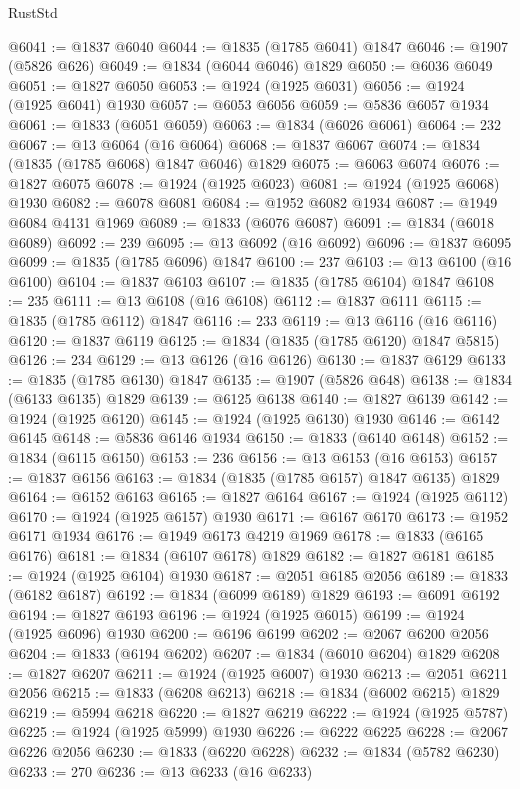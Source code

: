 \begin{lexlean}{RustStd}
\begin{coremodule}
{\begin{coremodule}
{{{{{@6041 := @1837 @6040
@6044 := @1835 (@1785 @6041) @1847
@6046 := @1907 (@5826 @626)
@6049 := @1834 (@6044 @6046) @1829
@6050 := @6036 @6049
@6051 := @1827 @6050
@6053 := @1924 (@1925 @6031)
@6056 := @1924 (@1925 @6041) @1930
@6057 := @6053 @6056
@6059 := @5836 @6057 @1934
@6061 := @1833 (@6051 @6059)
@6063 := @1834 (@6026 @6061)
@6064 := 232
@6067 := @13 @6064 (@16 @6064)
@6068 := @1837 @6067
@6074 := @1834 (@1835 (@1785 @6068) @1847 @6046) @1829
@6075 := @6063 @6074
@6076 := @1827 @6075
@6078 := @1924 (@1925 @6023)
@6081 := @1924 (@1925 @6068) @1930
@6082 := @6078 @6081
@6084 := @1952 @6082 @1934
@6087 := @1949 @6084 @4131 @1969
@6089 := @1833 (@6076 @6087)
@6091 := @1834 (@6018 @6089)
@6092 := 239
@6095 := @13 @6092 (@16 @6092)
@6096 := @1837 @6095
@6099 := @1835 (@1785 @6096) @1847
@6100 := 237
@6103 := @13 @6100 (@16 @6100)
@6104 := @1837 @6103
@6107 := @1835 (@1785 @6104) @1847
@6108 := 235
@6111 := @13 @6108 (@16 @6108)
@6112 := @1837 @6111
@6115 := @1835 (@1785 @6112) @1847
@6116 := 233
@6119 := @13 @6116 (@16 @6116)
@6120 := @1837 @6119
@6125 := @1834 (@1835 (@1785 @6120) @1847 @5815)
@6126 := 234
@6129 := @13 @6126 (@16 @6126)
@6130 := @1837 @6129
@6133 := @1835 (@1785 @6130) @1847
@6135 := @1907 (@5826 @648)
@6138 := @1834 (@6133 @6135) @1829
@6139 := @6125 @6138
@6140 := @1827 @6139
@6142 := @1924 (@1925 @6120)
@6145 := @1924 (@1925 @6130) @1930
@6146 := @6142 @6145
@6148 := @5836 @6146 @1934
@6150 := @1833 (@6140 @6148)
@6152 := @1834 (@6115 @6150)
@6153 := 236
@6156 := @13 @6153 (@16 @6153)
@6157 := @1837 @6156
@6163 := @1834 (@1835 (@1785 @6157) @1847 @6135) @1829
@6164 := @6152 @6163
@6165 := @1827 @6164
@6167 := @1924 (@1925 @6112)
@6170 := @1924 (@1925 @6157) @1930
@6171 := @6167 @6170
@6173 := @1952 @6171 @1934
@6176 := @1949 @6173 @4219 @1969
@6178 := @1833 (@6165 @6176)
@6181 := @1834 (@6107 @6178) @1829
@6182 := @1827 @6181
@6185 := @1924 (@1925 @6104) @1930
@6187 := @2051 @6185 @2056
@6189 := @1833 (@6182 @6187)
@6192 := @1834 (@6099 @6189) @1829
@6193 := @6091 @6192
@6194 := @1827 @6193
@6196 := @1924 (@1925 @6015)
@6199 := @1924 (@1925 @6096) @1930
@6200 := @6196 @6199
@6202 := @2067 @6200 @2056
@6204 := @1833 (@6194 @6202)
@6207 := @1834 (@6010 @6204) @1829
@6208 := @1827 @6207
@6211 := @1924 (@1925 @6007) @1930
@6213 := @2051 @6211 @2056
@6215 := @1833 (@6208 @6213)
@6218 := @1834 (@6002 @6215) @1829
@6219 := @5994 @6218
@6220 := @1827 @6219
@6222 := @1924 (@1925 @5787)
@6225 := @1924 (@1925 @5999) @1930
@6226 := @6222 @6225
@6228 := @2067 @6226 @2056
@6230 := @1833 (@6220 @6228)
@6232 := @1834 (@5782 @6230)
@6233 := 270
@6236 := @13 @6233 (@16 @6233)
}}}}}
\end{coremodule}}
\end{coremodule}
\end{lexlean}
